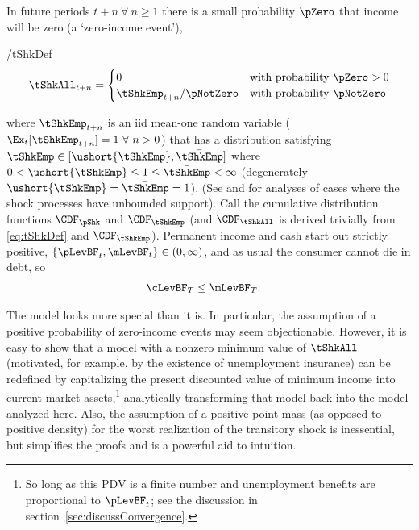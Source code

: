 \documentclass[./BufferStockTheory.tex]{subfiles}
\begin{document}
In future periods $t+n ~\forall~ n \geq 1$ there is a small probability $\pZero$ that income will
be zero (a `zero-income event'),
\begin{verbatimwrite}{\EqDir/tShkDef}
\begin{equation}
\tShkAll _{t+n}=
\begin{cases}
 0\phantom{_{t+1}/\pNotZero} & \text{with probability $\pZero>0$} \\
 \tShkEmp_{t+n}/\pNotZero      & \text{with probability $\pNotZero  $} %
\end{cases} \label{eq:tShkDef}
\end{equation}
\end{verbatimwrite}

where $\tShkEmp_{t+n}$ is an iid mean-one random variable
($\Ex_{t}[{\tShkEmp}_{t+n}]=1~\forall~n>0$)
that has a distribution
satisfying $\tShkEmp \in \lbrack \ushort{\tShkEmp},\bar{\tShkEmp}\rbrack$
where $0<\ushort{\tShkEmp} \leq 1 \leq \bar{\tShkEmp}<\infty$
(degenerately $\ushort{\tShkEmp}=\bar{\tShkEmp}=1$). (See \cite{rabaultBorrowing} and \cite{lsIncFluct} for analyses of cases where the shock processes have unbounded support).  Call the cumulative
distribution functions $\CDF_{\pShk}$ and $\CDF_{\tShkEmp}$ (and $\CDF_{\tShkAll}$
is derived trivially from \eqref{eq:tShkDef} and $\CDF_{\tShkEmp}$).
Permanent income and cash start out strictly positive, $\{\pLevBF_{t},\mLevBF_{t}\} \in
(0,\infty)$, and as usual the consumer cannot die in
debt, so
\begin{equation}\begin{gathered}\begin{aligned}
  \cLevBF_{T} & \leq  \mLevBF_{T} \label{eq:NoDebtAtDeath}.
\end{aligned}\end{gathered}\end{equation}

\hypertarget{PDV}{}
The model looks more special than it is.  In particular, the
assumption of a positive probability of zero-income events may seem
objectionable.  However, it is easy to show that a model with a
nonzero minimum value of $\tShkAll$ (motivated, for example, by the
existence of unemployment insurance) can be redefined by capitalizing
the present discounted value of minimum income into current market assets,\footnote{So long
  as this PDV is a finite number and unemployment benefits are
  proportional to $\pLevBF_{t}$; see the discussion in
  section~\ref{sec:discussConvergence}.}  analytically transforming
that model back into the model analyzed here.  Also, the assumption of
a positive point mass (as opposed to positive density) for the worst
realization of the transitory shock is inessential, but simplifies the proofs and is a powerful aid to intuition.
\end{document}
